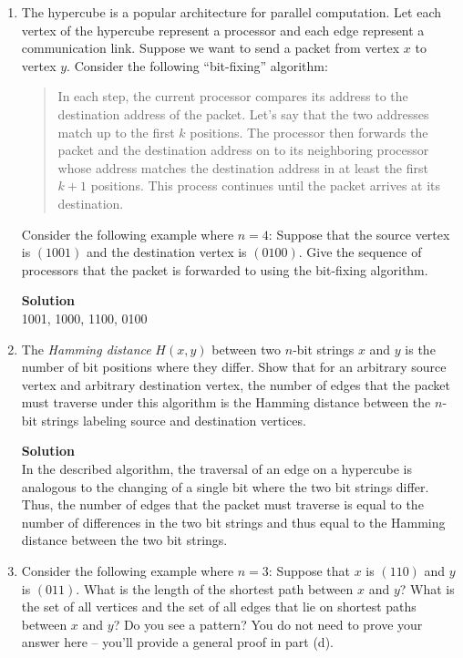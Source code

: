 \documentclass[11pt]{article}
\newenvironment{Parts}{\begin{enumerate}[label=(\alph*)]}{\end{enumerate}}
\newcommand*{\Part}{\item}
\newenvironment{Answer}{\vspace{10pt}\begin{mdframed}\textbf{Solution}\\}{\end{mdframed}\vfill\pagebreak[3]}
\newenvironment{Answer}{\vspace{10pt}}{\vfill\pagebreak[3]}
\begin{document}
\begin{Parts}
  \Part The hypercube is a popular architecture for parallel computation. Let
  each vertex of the hypercube represent a processor and each edge represent a
  communication link. Suppose we want to send a packet from vertex $x$ to vertex
  $y$. Consider the following ``bit-fixing'' algorithm:
  \begin{quote} In each step, the current processor compares its address to the
    destination address of the packet. Let's say that the two addresses match up
    to the first $k$ positions. The processor then forwards the packet and the
    destination address on to its neighboring processor whose address matches
    the destination address in at least the first $k+1$ positions. This process
    continues until the packet arrives at its destination.
 \end{quote}
 Consider the following example where $n=4$: Suppose that the source vertex is
 $(1001)$ and the destination vertex is $(0100)$. Give the sequence of
 processors that the packet is forwarded to using the bit-fixing algorithm.

 \begin{Answer}
 1001, 1000, 1100, 0100
 \end{Answer}


 \Part The \emph{Hamming distance} $H(x, y)$ between two $n$-bit strings $x$ and
 $y$ is the number of bit positions where they differ. Show that for an
 arbitrary source vertex and arbitrary destination vertex, the number of edges
 that the packet must traverse under this algorithm is the Hamming distance
 between the $n$-bit strings labeling source and destination vertices.

 \begin{Answer}
 In the described algorithm, the traversal of an edge on a hypercube is analogous to the changing of a single bit where the two bit strings differ. Thus, the number of edges that the packet must traverse is equal to the number of differences in the two bit strings and thus equal to the Hamming distance between the two bit strings.
 \end{Answer}

 \Part Consider the following example where $n=3$: Suppose that $x$ is $(110)$
 and $y$ is $(011)$. What is the length of the shortest path between $x$ and
 $y$?  What is the set of all vertices and the set of all edges that lie on
 shortest paths between $x$ and $y$? Do you see a pattern?  You do not need to
 prove your answer here -- you'll provide a general proof in part (d).


\end{Parts}
\end{document}
